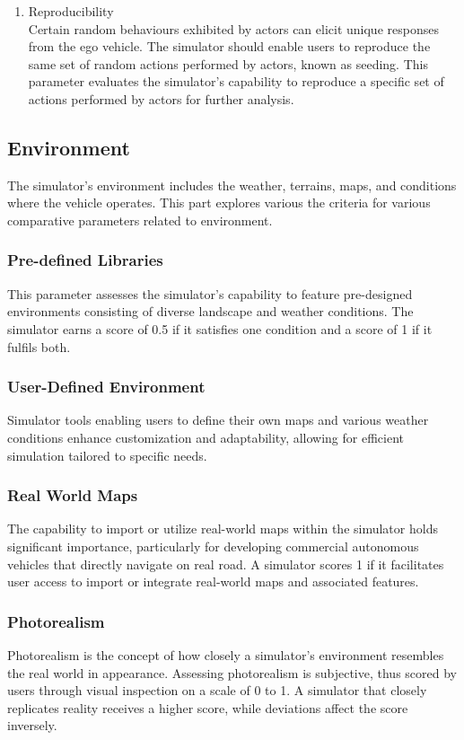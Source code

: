 \documentclass[12pt,twoside,a4paper,parskip]{scrbook} %
\begin{document}
\begin{enumerate}[label=\alph*.]
    \item Reproducibility\\
    Certain random behaviours exhibited by actors can elicit unique responses from the ego vehicle. The simulator should enable users to reproduce the same set of random actions performed by actors, known as seeding. This parameter evaluates the simulator's capability to reproduce a specific set of actions performed by actors for further analysis.
    
\end{enumerate}

\subsection{Environment}
The simulator's environment includes the weather, terrains, maps, and conditions where the vehicle operates. This part explores various the criteria for various comparative parameters related to environment. 
\subsubsection{Pre-defined Libraries}
This parameter assesses the simulator's capability to feature pre-designed environments consisting of diverse landscape and weather conditions. The simulator earns a score of 0.5 if it satisfies one condition and a score of 1 if it fulfils both.
\subsubsection{User-Defined Environment}
Simulator tools enabling users to define their own maps and various weather conditions enhance customization and adaptability, allowing for efficient simulation tailored to specific needs.
\subsubsection{Real World Maps}
The capability to import or utilize real-world maps within the simulator holds significant importance, particularly for developing commercial autonomous vehicles that directly navigate on real road. A simulator scores 1 if it facilitates user access to import or integrate real-world maps and associated features.
\subsubsection{Photorealism}
Photorealism is the concept of how closely a simulator's environment resembles the real world in appearance. Assessing photorealism is subjective, thus scored by users through visual inspection on a scale of 0 to 1. A simulator that closely replicates reality receives a higher score, while deviations affect the score inversely.
\end{document}
